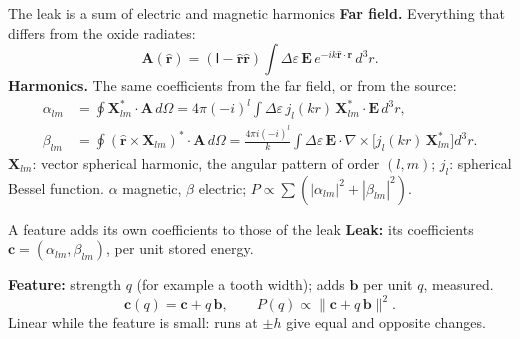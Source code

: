 \documentclass[11pt, aspectratio=169]{beamer}
\begin{document}
\begin{frame}{The leak is a sum of electric and magnetic harmonics}
    \vspace{0.05cm}
    \textbf{Far field.} Everything that differs from the oxide radiates:
    \[
        \mathbf A(\hat{\mathbf r}) = (\mathsf I-\hat{\mathbf r}\hat{\mathbf r})\int \Delta\varepsilon\,\mathbf E\,e^{-ik\hat{\mathbf r}\cdot\mathbf r}\,d^3r .
    \]
    \textbf{Harmonics.} The same coefficients from the far field, or from the source:
    \begin{align*}
        \alpha_{lm}&=\oint\mathbf X^*_{lm}\cdot\mathbf A\,d\Omega=4\pi(-i)^l\!\int\Delta\varepsilon\,j_l(kr)\,\mathbf X^*_{lm}\cdot\mathbf E\,d^3r,\\
        \beta_{lm}&=\oint(\hat{\mathbf r}\times\mathbf X_{lm})^*\cdot\mathbf A\,d\Omega=\frac{4\pi i(-i)^l}{k}\!\int\Delta\varepsilon\,\mathbf E\cdot\nabla\times\bigl[j_l(kr)\,\mathbf X^*_{lm}\bigr]d^3r .
    \end{align*}
    {\footnotesize $\mathbf X_{lm}$: vector spherical harmonic, the angular pattern of order $(l,m)$; $j_l$: spherical Bessel function. $\alpha$ magnetic, $\beta$ electric; $P\propto\sum(|\alpha_{lm}|^2+|\beta_{lm}|^2)$.}
\end{frame}

\begin{frame}{A feature adds its own coefficients to those of the leak}
    \vspace{0.10cm}
    \textbf{Leak:} its coefficients $\mathbf c=(\alpha_{lm},\beta_{lm})$, per unit stored energy.
    \vspace{0.20cm}

    \textbf{Feature:} strength $q$ (for example a tooth width); adds $\mathbf b$ per unit $q$, measured.
    \[
        \mathbf c(q)=\mathbf c+q\,\mathbf b,\qquad P(q)\propto\|\mathbf c+q\,\mathbf b\|^2 .
    \]
    {\footnotesize Linear while the feature is small: runs at $\pm h$ give equal and opposite changes.}
\end{frame}
\end{document}
